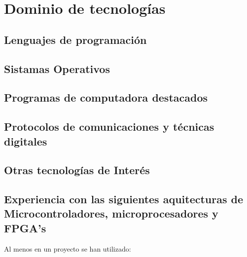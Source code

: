 
\section{Dominio de tecnologías}
   \subsection{Lenguajes de programación}
      \cvitem { \dicadvanced }{\proglangadvanced }
      \cvitem { \dicmedium   }{\proglangmedium   }
      \cvitem { \dicbasic    }{\proglangbasic    }

   \subsection{Sistamas Operativos}
      \cvitem { \dicadvanced } { \osadvanced }
      \cvitem { \dicmedium   } { \osmedium   }
      \cvitem { \dicbasic    } { \osbasic    }

   \subsection{Programas de computadora destacados}
      \cvitem { \dicadvanced } { \computerprogadvanced }
      \cvitem { \dicmedium   } { \computerprogmedium   }
      \cvitem { \dicbasic    } { \computerprogbasic    }

   \subsection{Protocolos de comunicaciones y técnicas digitales}
      \cvitem{\dicadvanced }{ \protocoladvanced }
      \cvitem{\dicmedium   }{ \protocolmedium   }
      \cvitem{\dicbasic    }{ \protocolbasic    }

   \subsection{Otras tecnologías de Interés}
      \cvitem{\dicadvanced} { \othertechadvanced }
      \cvitem{\dicmedium  } { \othertechmedium   }
      \cvitem{\dicbasic   } { \othertechbasic    }

   \subsection{Experiencia con las siguientes aquitecturas de Microcontroladores, microprocesadores y FPGA's}
      \cvitem {} {Al menos en un proyecto se han utilizado:}

